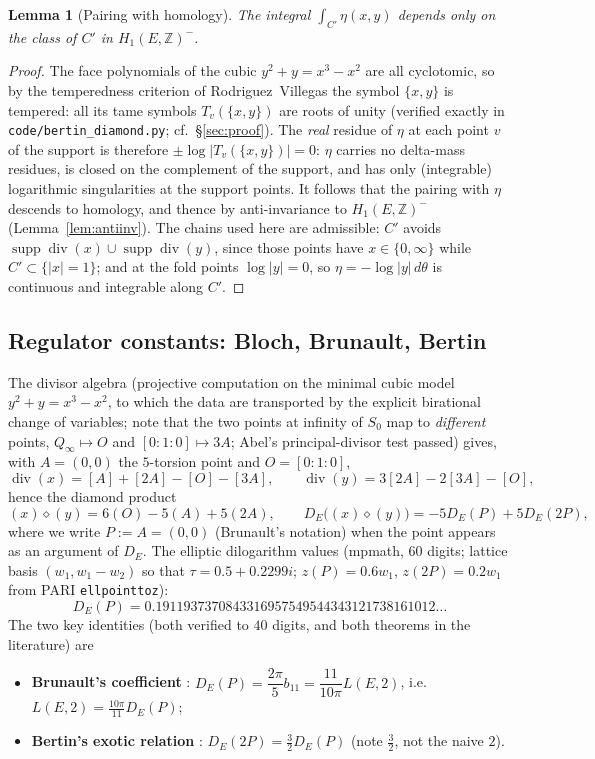 \documentclass[preprint,12pt]{elsarticle}
\newtheorem{lemma}[theorem]{Lemma}
\theoremstyle{definition}
\theoremstyle{remark}
\newcommand{\Z}{\mathbb{Z}}
\DeclareMathOperator{\divisor}{div}
\begin{document}
\begin{lemma}[Pairing with homology]\label{lem:homology}
The integral $\int_{C'}\eta(x,y)$ depends only on the class of $C'$ in
$H_1(E,\Z)^-$.
\end{lemma}

\begin{proof}
The face polynomials of the cubic $y^2+y=x^3-x^2$ are all cyclotomic, so
by the temperedness criterion of Rodriguez~Villegas \cite{RV} the symbol
$\{x,y\}$ is tempered: all its tame symbols $T_v(\{x,y\})$ are roots of
unity (verified exactly in \texttt{code/bertin\_diamond.py}; cf.\
\S\ref{sec:proof}).  The \emph{real} residue of $\eta$ at each point $v$
of the support is therefore $\pm\log|T_v(\{x,y\})|=0$: $\eta$ carries no
delta-mass residues, is closed on the complement of the support, and has
only (integrable) logarithmic singularities at the support points.  It
follows that the pairing with $\eta$ descends to homology, and thence by
anti-invariance to $H_1(E,\Z)^-$ (Lemma~\ref{lem:antiinv}).  The chains
used here are admissible: $C'$ avoids
$\operatorname{supp}\divisor(x)\cup\operatorname{supp}\divisor(y)$, since
those points have $x\in\{0,\infty\}$ while $C'\subset\{|x|=1\}$; and at
the fold points $\log|y|=0$, so $\eta=-\log|y|\,d\theta$ is continuous
and integrable along $C'$.
\end{proof}

\subsection{Regulator constants: Bloch, Brunault, Bertin}
\label{subsec:anchor}

The divisor algebra (projective computation on the minimal cubic model
$y^2+y=x^3-x^2$, to which the data are transported by the explicit birational
change of variables; note that the two points at infinity of $S_0$ map to
\emph{different} points, $Q_\infty\mapsto O$ and $[0:1:0]\mapsto 3A$; Abel's
principal-divisor test passed) gives, with
$A=(0,0)$ the $5$-torsion point and $O=[0:1:0]$,
\[
  \divisor(x)=[A]+[2A]-[O]-[3A],\qquad
  \divisor(y)=3[2A]-2[3A]-[O],
\]
hence the diamond product
\[
  (x)\diamond(y)=6(O)-5(A)+5(2A),\qquad
  D_E\big((x)\diamond(y)\big)=-5D_E(P)+5D_E(2P),
\]
where we write $P:=A=(0,0)$ (Brunault's notation) when the point appears as
an argument of $D_E$.
The elliptic dilogarithm values (mpmath, $60$ digits; lattice basis
$(w_1,w_1-w_2)$ so that $\tau=0.5+0.2299i$; $z(P)=0.6w_1$, $z(2P)=0.2w_1$
from PARI \texttt{ellpointtoz}):
\[
  D_E(P)=0.1911937370843316957549544343121738161012\ldots
\]
The two key identities (both verified to $40$ digits, and both theorems in
the literature) are
\begin{itemize}
  \item \textbf{Brunault's coefficient} \cite[(3.151)]{Brunault}:
  $D_E(P)=\dfrac{2\pi}{5}b_{11}=\dfrac{11}{10\pi}L(E,2)$, i.e.\
  $L(E,2)=\frac{10\pi}{11}D_E(P)$;
  \item \textbf{Bertin's exotic relation} \cite{Bertin,BertinCrelle,Touafek}:
  $D_E(2P)=\frac32D_E(P)$ (note $\tfrac32$, not the naive $2$).
\end{itemize}
\end{document}
